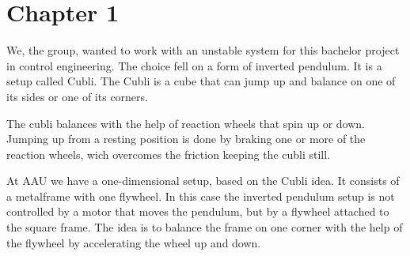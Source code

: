 \chapter{Chapter 1}
We, the group, wanted to work with an unstable system for this bachelor project in control engineering. The choice fell on a form of inverted pendulum. It is a setup called Cubli.
The Cubli is a cube that can jump up and balance on one of its sides or one of its corners.\cite{MGajamohan}

The cubli balances with the help of reaction wheels that spin up or down. Jumping up from a resting position is done by braking one or more of the reaction wheels, wich overcomes the friction keeping the cubli still.



At AAU we have a one-dimensional setup, based on the Cubli idea. It consists of a metalframe with one flywheel. In this case the inverted pendulum setup is not controlled by a motor that moves the pendulum, but by a flywheel attached to the square frame. The idea is to balance the frame on one corner with the help of the flywheel by accelerating the wheel up and down.


